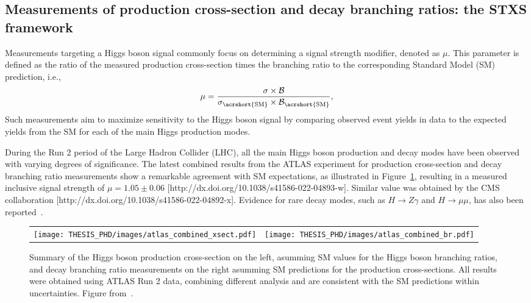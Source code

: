 \documentclass[11pt,twoside]{book}
\begin{document}
\subsection{Measurements of production cross-section and decay branching ratios: the STXS framework}
\label{sec:stxs_yukawa}


Measurements targeting a Higgs boson signal commonly focus on determining a signal strength modifier, denoted as $\mu$. This parameter is defined as the ratio of the measured production cross-section times the branching ratio to the corresponding Standard Model (\acrshort{SM}) prediction, i.e.,
\begin{equation}
\label{signal_strength}
    \mu = \frac{\sigma \times \mathcal{B}}{\sigma_{\mathrm{\acrshort{SM}}} \times \mathcal{B}_{\mathrm{\acrshort{SM}}}},
\end{equation}
Such measurements aim to maximize sensitivity to the Higgs boson signal by comparing observed event yields in data to the expected yields from the \acrshort{SM} for each of the main Higgs production modes.

During the Run 2 period of the Large Hadron Collider (LHC), all the main Higgs boson production and decay modes have been observed with varying degrees of significance. The latest combined results from the ATLAS experiment for production cross-section and decay branching ratio measurements show a remarkable agreement with \acrshort{SM} expectations, as illustrated in Figure~\ref{higgs_comb}, resulting in a measured inclusive signal strength of $\mu = 1.05 \pm 0.06$ [http://dx.doi.org/10.1038/s41586-022-04893-w]. Similar value was obtained by the CMS collaboration [http://dx.doi.org/10.1038/s41586-022-04892-x]. Evidence for rare decay modes, such as $H \to Z\gamma$ and $H \to \mu\mu$, has also been reported~\cite{http://dx.doi.org/10.1103/PhysRevLett.132.021803, http://dx.doi.org/10.1007/JHEP01(2021)148}.

\begin{figure}[htbp]
\label{higgs_comb}
    \centering
    \begin{tabular}{cc}
    \texttt{[image: THESIS\_PHD/images/atlas\_combined\_xsect.pdf]} & 
    \texttt{[image: THESIS\_PHD/images/atlas\_combined\_br.pdf]}
    \end{tabular}
    
    \caption{Summary of the Higgs boson production cross-section on the left, asumming \acrshort{SM} values for the Higgs boson branching ratios, and decay branching ratio measurements on the right asumming \acrshort{SM} predictions for the production cross-sections. All results were obtained using ATLAS Run 2 data, combining different analysis and are consistent with the \acrshort{SM} predictions within uncertainties. Figure from~\cite{arXiv: 2207.00092 [hep-ex]}.}
\end{figure}
\end{document}
